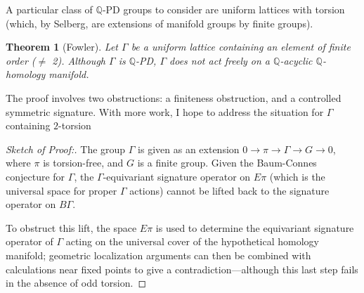 \documentclass[12pt]{amsart}
\newtheorem*{theorem*}{Theorem}
\theoremstyle{definition}
\newcommand{\Q}{\mathbb{Q}}
\begin{document}
A particular class of $\Q$-PD groups to consider are uniform lattices
with torsion (which, by Selberg, are extensions of manifold groups by
finite groups).
\begin{theorem*}[Fowler]
  Let $\Gamma$ be a uniform lattice containing an element of finite
  order ($\neq$ 2).  Although $\Gamma$ is $\Q$-PD, $\Gamma$ does not
  act freely on a $\Q$-acyclic $\Q$-homology manifold.
\end{theorem*}
\noindent
The proof involves two obstructions: a finiteness obstruction, and a
controlled symmetric signature.  With more work, I hope to address the
situation for $\Gamma$ containing $2$-torsion
\begin{proof}[Sketch of Proof:]
The group $\Gamma$ is given as an extension $0 \to \pi \to \Gamma \to G \to 0$, where
$\pi$ is torsion-free, and $G$ is a finite group.  Given the
Baum-Connes conjecture for $\Gamma$, the $\Gamma$-equivariant
signature operator on $E\pi$ (which is the universal space for proper
$\Gamma$ actions) cannot be lifted back to the signature operator on
$B\Gamma$.

To obstruct this lift, the space $E\pi$ is used to determine the
equivariant signature operator of $\Gamma$ acting on the universal
cover of the hypothetical homology manifold; geometric localization
arguments can then be combined with calculations near fixed points to
give a contradiction---although this last step fails in the absence of
odd torsion.
\end{proof}



\end{document}
